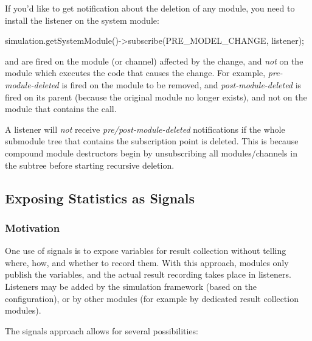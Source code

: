 If you'd like to get notification about the deletion of any module, you need
to install the listener on the system module:

\begin{cpp}
simulation.getSystemModule()->subscribe(PRE_MODEL_CHANGE, listener);
\end{cpp}

\begin{note}
   and  are fired on the
  module (or channel) affected by the change, and \textit{not} on the module
  which executes the code that causes the change. For example,
  \textit{pre-module-deleted} is fired on the module to be removed, and
  \textit{post-module-deleted} is fired on its parent (because the original
  module no longer exists), and not on the module that contains the
   call.
\end{note}

\begin{note}
  A listener will \textit{not} receive \textit{pre/post-module-deleted}
  notifications if the whole submodule tree that contains the subscription
  point is deleted. This is because compound module destructors begin
  by unsubscribing all modules/channels in the subtree before starting
  recursive deletion.
\end{note}


\subsection{Exposing Statistics as Signals}
\label{sec:ch-simple-modules:statistic-signals}

\subsubsection{Motivation}

One use of signals is to expose variables for result collection without
telling where, how, and whether to record them. With this approach,
modules only publish the variables, and the actual result recording
takes place in listeners. Listeners may be added by the simulation
framework (based on the configuration), or by other modules (for example
by dedicated result collection modules).

The signals approach allows for several possibilities:


